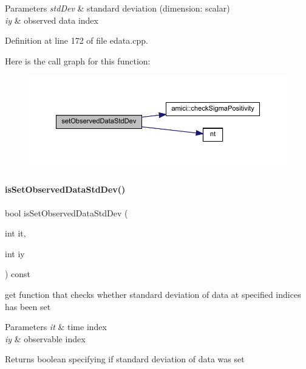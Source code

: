 \begin{DoxyParams}{Parameters}
{\em std\+Dev} & standard deviation (dimension\+: scalar) \\
\hline
{\em iy} & observed data index \\
\hline
\end{DoxyParams}


Definition at line 172 of file edata.\+cpp.

Here is the call graph for this function\+:
\nopagebreak
\begin{figure}[H]
\begin{center}
\leavevmode
\includegraphics[width=350pt]{classamici_1_1_exp_data_a10c64e99f5f3a2b19e3944b69b0d69ff_cgraph}
\end{center}
\end{figure}
\mbox{\label{classamici_1_1_exp_data_a75808a32f77afa60bb736a1dfbce9aba}} 
\paragraph{\texorpdfstring{isSetObservedDataStdDev()}{isSetObservedDataStdDev()}}
{\footnotesize\ttfamily bool is\+Set\+Observed\+Data\+Std\+Dev (\begin{DoxyParamCaption}\item[{int}]{it,  }\item[{int}]{iy }\end{DoxyParamCaption}) const}

get function that checks whether standard deviation of data at specified indices has been set


\begin{DoxyParams}{Parameters}
{\em it} & time index \\
\hline
{\em iy} & observable index \\
\hline
\end{DoxyParams}
\begin{DoxyReturn}{Returns}
boolean specifying if standard deviation of data was set 
\end{DoxyReturn}


